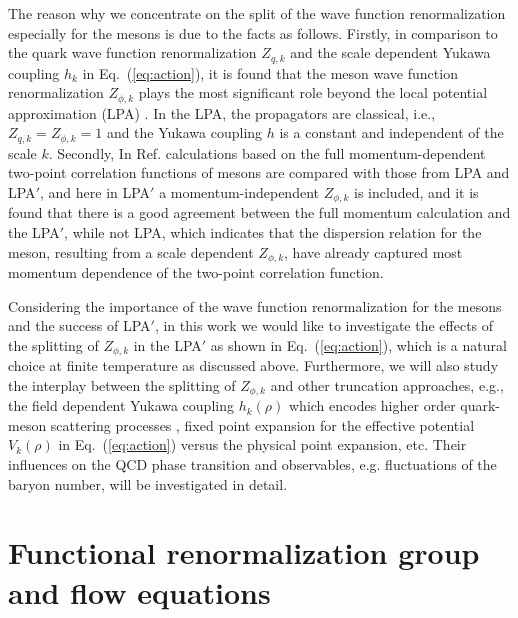 \documentclass[%
reprint,
superscriptaddress,
showpacs,preprintnumbers,
 amsmath,amssymb,
 aps,
prd,
]{revtex4-1}
\def\Eq#1{Eq.~(\ref{#1})}
\begin{document}
The reason why we concentrate on the split of the wave function renormalization especially for the mesons is due to the facts as follows. Firstly, in comparison to the quark wave function renormalization $Z_{q,k}$ and the scale dependent Yukawa coupling $h_k$ in \Eq{eq:action}, it is found that the meson wave function renormalization $Z_{\phi,k}$ plays the most significant role beyond the local potential approximation (LPA) \cite{Pawlowski:2014zaa,Fu:2015naa}. In the LPA, the propagators are classical, i.e., $Z_{q,k}=Z_{\phi,k}=1$ and the Yukawa coupling $h$ is a constant and independent of the scale $k$. Secondly, In Ref. \cite{Helmboldt:2014iya} calculations based on the full momentum-dependent two-point correlation functions of mesons are compared with those from LPA and LPA$'$, and here in LPA$'$ a momentum-independent $Z_{\phi,k}$ is included, and it is found that there is a good agreement between the full momentum calculation and the LPA$'$, while not LPA, which indicates that the dispersion relation for the meson, resulting from a scale dependent $Z_{\phi,k}$, have already captured most momentum dependence of the two-point correlation function. 

Considering the importance of the wave function renormalization for the mesons and the success of LPA$'$, in this work we would like to investigate the effects of the splitting of $Z_{\phi,k}$ in the LPA$'$ as shown in \Eq{eq:action}, which is a natural choice at finite temperature as discussed above. Furthermore, we will also study the interplay between the splitting of $Z_{\phi,k}$ and other truncation approaches, e.g., the field dependent Yukawa coupling $h_k(\rho)$ which encodes higher order quark-meson scattering processes \cite{Pawlowski:2014zaa}, fixed point expansion for the effective potential $V_k(\rho)$ in \Eq{eq:action} versus the physical point expansion, etc. Their influences on the QCD phase transition and observables, e.g. fluctuations of the baryon number, will be investigated in detail.



\section{Functional renormalization group and flow equations}
\label{sec:FRG}
\end{document}
